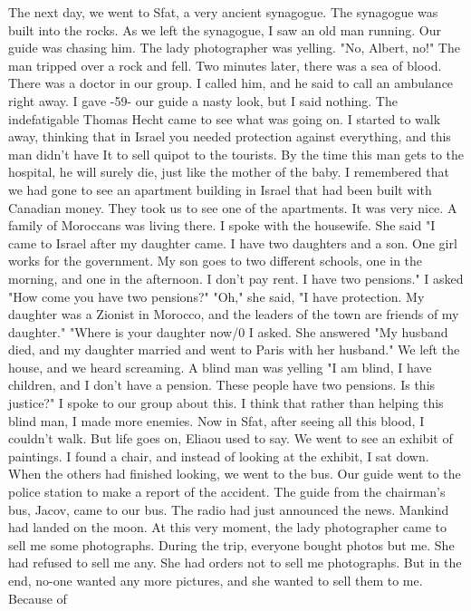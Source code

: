 The next day, we went to Sfat, a very ancient synagogue. The synagogue was built into the rocks. As we left the synagogue, I saw an old 
man running. Our guide was chasing him. The lady photographer was yelling. "No, Albert, no!" The man tripped over a rock and fell. Two minutes 
later, there was a sea of blood. There was a doctor in our 
group. I called him, and he said to call an ambulance right away. I gave 
-59- 
our guide a nasty look, but I said nothing. The indefatigable Thomas Hecht 
came to see what was going on. I started to walk away, thinking that in 
Israel you needed protection against everything, and this man didn't have 
It to sell quipot to the tourists. By the time this man gets to the 
hospital, he will surely die, just like the mother of the baby. I remembered that we had gone to see an apartment building in Israel that had been 
built with Canadian money. They took us to see one of the apartments. It 
was very nice. A family of Moroccans was living there. I spoke with the 
housewife. She said "I came to Israel after my daughter came. I have two 
daughters and a son. One girl works for the government. My son goes to 
two different schools, one in the morning, and one in the afternoon. I don't 
pay rent. I have two pensions." I asked "How come you have two pensions?" 
"Oh," she said, "I have protection. My daughter was a Zionist in Morocco, 
and the leaders of the town are friends of my daughter." "Where is your 
daughter now/0 I asked. She answered "My husband died, and my daughter 
married and went to Paris with her husband." We left the house, and we 
heard screaming. A blind man was yelling "I am blind, I have children, and 
I don't have a pension. These people have two pensions. Is this justice?" 
I spoke to our group about this. I think that rather than helping this 
blind man, I made more enemies. Now in Sfat, after seeing all this blood, 
I couldn't walk. But life goes on, Eliaou used to say. 
We went to see an exhibit of paintings. I found a chair, and instead 
of looking at the exhibit, I sat down. When the others had finished looking, we went to the bus. Our guide went to the police station to make a 
report of the accident. The guide from the chairman's bus, Jacov, came to 
our bus. The radio had just announced the news. Mankind had landed on the moon. 
At this very moment, the lady photographer came to sell me some photographs. 
During the trip, everyone bought photos but me. She had refused to sell me 
any. She had orders not to sell me photographs. But in the end, no-one 
wanted any more pictures, and she wanted to sell them to me. Because of 
